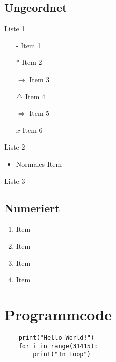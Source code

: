 \subsection{Ungeordnet}
Liste 1
\begin{itemize}
    \item[-] Item 1
    \item[*] Item 2
    \item[$\rightarrow$] Item 3
    \item[$\triangle$] Item 4
    \item[$\Rightarrow$] Item 5
    \item[$x$] Item 6
\end{itemize}
Liste 2
\begin{itemize}
    \item Normales Item
\end{itemize}
Liste 3
\subsection{Numeriert}
\begin{enumerate}
    \item Item
    \item Item
    \item Item
    \item Item
\end{enumerate}

\section{Programmcode}
\begin{lstlisting}
    print("Hello World!")
    for i in range(31415):
        print("In Loop")
\end{lstlisting}